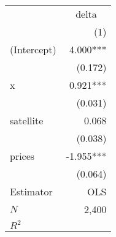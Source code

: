 \begin{tabular}{lr}
\toprule
            & \multicolumn{1}{c}{delta} \\ 
\cmidrule(lr){2-2} 
            &                       (1) \\ 
\midrule
(Intercept) &                  4.000*** \\ 
            &                   (0.172) \\ 
x           &                  0.921*** \\ 
            &                   (0.031) \\ 
satellite   &                     0.068 \\ 
            &                   (0.038) \\ 
prices      &                 -1.955*** \\ 
            &                   (0.064) \\ 
\midrule
Estimator   &                       OLS \\ 
\midrule
$N$         &                     2,400 \\ 
$R^2$       &                           \\ 
\bottomrule
\end{tabular}
